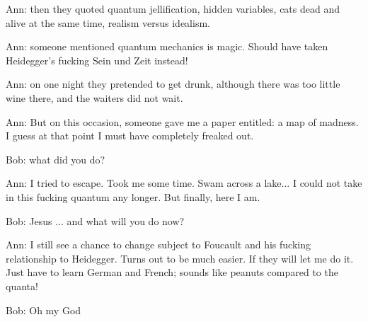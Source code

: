 Ann: then they quoted quantum jellification, hidden variables, cats dead and alive at the same time, realism versus idealism.

Ann: someone mentioned quantum mechanics is magic.   Should have taken  Heidegger's fucking Sein und Zeit instead!

Ann: on one night they pretended to get drunk, although there was too little wine there, and the waiters did not wait.

Ann: But on this occasion, someone gave me a paper entitled: a map of madness. I guess at that point I must have completely freaked out.

Bob: what did you do?

Ann: I tried to escape. Took me some time. Swam across a lake... I could not take in this fucking quantum any longer. But finally, here I am.

Bob: Jesus ... and what will you do now?

Ann: I still see a chance to change subject to Foucault and his fucking relationship to Heidegger. Turns out to be much easier. If they will let me do it. Just have to learn German and French; sounds like peanuts compared to the quanta!

Bob: Oh my God
